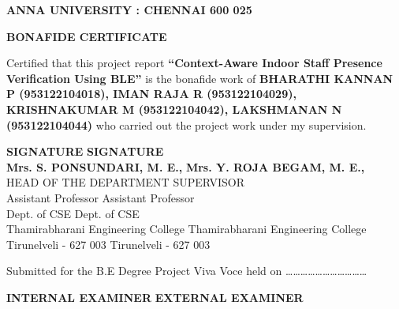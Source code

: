 \centering
{\Large \textbf{ANNA UNIVERSITY : CHENNAI 600 025} \par}
\vspace{1.5cm}
{\Large \textbf{BONAFIDE CERTIFICATE} \par}
\vspace{1.5cm}
\doublespacing %
\normalsize
Certified that this project report \textbf{“Context-Aware Indoor Staff Presence Verification Using BLE”} is the bonafide work of \textbf{BHARATHI KANNAN P (953122104018), IMAN RAJA R (953122104029), KRISHNAKUMAR M (953122104042), LAKSHMANAN N (953122104044)} who carried out the project work under my supervision.

\vspace{3cm}
\onehalfspacing
\noindent \textbf{SIGNATURE} \hfill \textbf{SIGNATURE} \\
\noindent \textbf{Mrs. S. PONSUNDARI, M. E.,} \hfill \textbf{Mrs. Y. ROJA BEGAM, M. E.,} \\
\noindent HEAD OF THE DEPARTMENT \hfill SUPERVISOR \\
\noindent Assistant Professor \hfill Assistant Professor \\
\noindent Dept. of CSE \hfill Dept. of CSE \\
\noindent Thamirabharani Engineering College \hfill Thamirabharani Engineering College \\
\noindent Tirunelveli - 627 003 \hfill Tirunelveli - 627 003

\vspace{2cm}
\doublespacing
\noindent Submitted for the B.E Degree Project Viva Voce held on \dots\dots\dots\dots\dots\dots\dots\dots\dots\dots\dots

\vspace{2cm}
\noindent \textbf{INTERNAL EXAMINER} \hfill \textbf{EXTERNAL EXAMINER}
